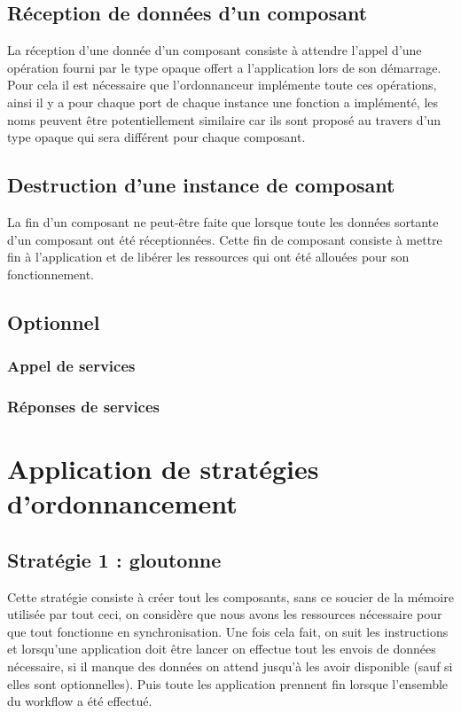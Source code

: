 \documentclass{article}
\begin{document}
\subsection{Réception de données d'un composant}
La réception d'une donnée d'un composant consiste à attendre l'appel d'une opération fourni par le type opaque offert a l'application lors de son démarrage. Pour cela il est nécessaire que l'ordonnanceur implémente toute ces opérations, ainsi il y a pour chaque port de chaque instance une fonction a implémenté, les noms peuvent être potentiellement similaire car ils sont proposé au travers d'un type opaque qui sera différent pour chaque composant.


\subsection{Destruction d'une instance de composant}
La fin d'un composant ne peut-être faite que lorsque toute les données sortante d'un composant ont été réceptionnées. Cette fin de composant consiste à mettre fin à l'application et de libérer les ressources qui ont été allouées pour son fonctionnement.

\subsection{Optionnel}

\subsubsection{Appel de services}

\subsubsection{Réponses de services}

\pagebreak
\section{Application de stratégies d'ordonnancement}

\subsection{Stratégie 1 : gloutonne}
Cette stratégie consiste à créer tout les composants, sans ce soucier de la mémoire utilisée par tout ceci, on considère que nous avons les ressources nécessaire pour que tout fonctionne en synchronisation. Une fois cela fait, on suit les instructions et lorsqu'une application doit être lancer on effectue tout les envois de données nécessaire, si il manque des données on attend jusqu'à les avoir disponible (sauf si elles sont optionnelles). Puis toute les application prennent fin lorsque l'ensemble du workflow a été effectué.\\
\end{document}
